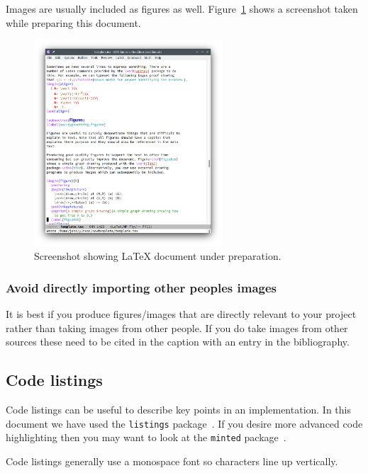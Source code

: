 \documentclass[12pt]{article}
\theoremstyle{plain}
\theoremstyle{definition}
\begin{document}
Images are usually included as figures as
well. Figure~\ref{fig:screenshot} shows a screenshot taken while
preparing this document.
\begin{figure}[ht]
  \centering
  \includegraphics[width=70mm]{img/screenshot}
  \caption{Screenshot showing LaTeX document under preparation.}
  \label{fig:screenshot}
\end{figure}

\subsubsection{Avoid directly importing other peoples images}

It is best if you produce figures/images that are directly relevant to
your project rather than taking images from other people. If you do
take images from other sources these need to be cited in the caption
with an entry in the bibliography.

\subsection{Code listings}
\label{sec:typesetting_listings}

Code listings can be useful to describe key points in an
implementation. In this document we have used the \verb|listings|
package~\cite{ctan-listings}. If you desire more advanced code
highlighting then you may want to look at the \verb|minted|
package~\cite{ctan-minted}.

Code listings generally use a monospace font so characters line up
vertically.


\end{document}
